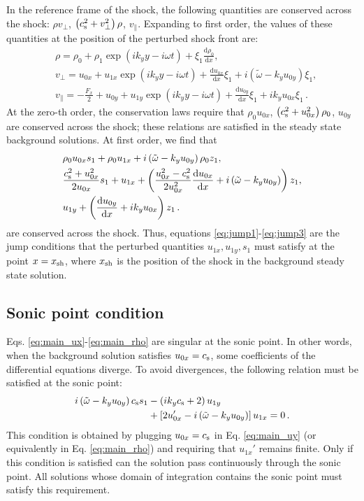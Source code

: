 \documentclass[useAMS,usenatbib]{mn2e}
\begin{document}
In the reference frame of the shock, the following quantities are conserved across the shock: $\rho v_\perp$, $\left(c_{\rm s}^2+v_\perp^2\right)\rho$, $v_\parallel$. Expanding to first order, the values of these quantities at the position of the perturbed shock front are:
%
\begin{align}
& \rho=\rho_0+\rho_1\exp\left(i k_y y - i \omega t \right)+\xi_1\frac{\text{d}\rho_0}{\text{d}x} , \\
& v_\perp=u_{0x}+u_{1x}\exp\left(i k_y y - i \omega t \right)+\frac{\text{d}u_{0x}}{\text{d}x}\xi_1+i\left( \tilde{\omega} - k_y u_{0y} \right)\xi_1 , \\
& v_\parallel=-\frac{F_x}{2}+u_{0y}+u_{1y}\exp\left(i k_y y - i \omega t \right)+\frac{\text{d}u_{0y}}{\text{d}x}\xi_1+ik_y u_{0x}\xi_1 \, .
\end{align}
%
At the zero-th order, the conservation laws require that $\rho_0 u_{0x}$, $\left(c_{\rm s}^2+u_{0x}^2\right)\rho_0$, $u_{0y}$ are conserved across the shock; these relations are satisfied in the steady state background solutions. At first order, we find that
%
\begin{align}
& \rho_0 u_{0x}s_1+\rho_0 u_{1x}+i\left( \tilde{\omega} - k_y u_{0y} \right)\rho_0 z_1 , \label{eq:jump1} \\
& \frac{c_{\rm s}^2+u_{0x}^2}{2u_{0x}}s_1+u_{1x} +\left(\frac{u_{0x}^2-c_{\rm s}^2}{2u_{0x}^2}\frac{\text{d}u_{0x}}{\text{d}x}+i\left( \tilde{\omega} - k_y u_{0y} \right)\right)z_1, \label{eq:jump2} \\
& u_{1y}+\left(\frac{\text{d}u_{0y}}{\text{d}x}+ik_y u_{0x}\right)z_1 \label{eq:jump3} \,.
\end{align}
%
are conserved across the shock. Thus, equations \eqref{eq:jump1}-\eqref{eq:jump3} are the jump conditions that the perturbed quantities $u_{1x}, u_{1y}, s_1$ must satisfy at the point $x=x_{\rm sh}$, where $x_{\rm sh}$ is the position of the shock in the background steady state solution.

\subsection{Sonic point condition}

Eqs. \eqref{eq:main_ux}-\eqref{eq:main_rho} are singular at the sonic point. In other words, when the background solution satisfies $u_{0x}=c_{\rm s}$, some coefficients of the differential equations diverge. To avoid divergences, the following relation must be satisfied at the sonic point:
\begin{align}
i\left(\tilde{\omega}-k_y u_{0y}\right)c_{\rm s} s_1&-\left(ik_y c_{\rm s}+2\right)u_{1y}\nonumber\\
&+\left[2u_{0x}'-i\left(\tilde{\omega}-k_y u_{0y}\right)\right]u_{1x}=0 \, . \label{eq:sonic}
\end{align}
This condition is obtained by plugging $u_{0x}=c_{\rm s}$ in Eq. \eqref{eq:main_uy} (or equivalently in Eq. \ref{eq:main_rho}) and requiring that $u_{1x}'$ remains finite. Only if this condition is satisfied can the solution pass continuously through the sonic point. All solutions whose domain of integration contains the sonic point must satisfy this requirement.
\end{document}

